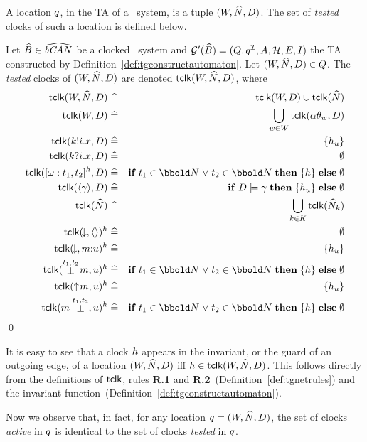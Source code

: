 A location $q$, in the TA of a \bcandle\ system, is a tuple
$(W,{\widehat{N}},{D})$. The set of \emph{tested} clocks of
such a location is defined below.
\begin{definition}\label{def:sgtclk}
Let ${\widehat{{B}}} \in {\widehat{{\text{\it bCAN\/}_{}}}}$ be a clocked \bcandle\ system and $\GrImpl(\csys)
= (\tglocs,\tgiloc,\Actions,\clocks,\tgedges,\tginv)$
the TA constructed by Definition~\ref{def:tgconstructautomaton}. 
Let $(W,{\widehat{N}},{D}) \in Q$. The \emph{tested} clocks of
$(W,{\widehat{N}}, {D})$ are denoted ${\mathop{\mathrm{t}{\sf clk}}}(W,{\widehat{N}},{D})$, where
\begin{eqnarray*}
\tclk(\W,\NN,\D) & \defs & \tclk(\W,\D) \cup \tclk(\NN) \\
\tclk(\W,\D) & \defs & \bigcup_{\ww \in \W} \tclk(\tattrib\tr_\ww, \D) \\
\tclk(\kk!\ii.\xx,\D) & \defs & \{\uclock\} \\
\tclk(\kk?\ii.\xx,\D) & \defs & \emptyset \\
\tclk([\op:\ti_1,\ti_2]^\clock,\D) & \defs & \ite{\ti_1 \in \nat \lor \ti_2 \in \nat}{\{\clock\}}{\emptyset} \\
\tclk(\gu{\g},\D) & \defs & \ite{\D \models \g}{\{\uclock\}}{\emptyset} \\
\tclk(\NN) & \defs & \bigcup_{\kk \in \K} \tclk(\NN_\kk) \\
\tclk(\free,\emq)^\clock & \defs & \emptyset \\
\tclk(\free,\mm\cq\mq)^\clock & \defs & \{\uclock\} \\
\tclk(\preact{\ti_1,\ti_2}{\mm},\mq)^\clock & \defs & \ite{\ti_1 \in \nat \lor \ti_2 \in \nat}{\{\clock\}}{\emptyset} \\
\tclk(\offers{\mm},\mq)^\clock & \defs & \{\uclock\} \\
\tclk(\postact{\ti_1,\ti_2}{\mm},\mq)^\clock & \defs & \ite{\ti_1 \in \nat \lor \ti_2 \in \nat}{\{\clock\}}{\emptyset}
\end{eqnarray*}   
\qed
\end{definition}
It is easy to see that a clock $h$ appears in the invariant, or
the guard of an outgoing edge, of a location $(W,{\widehat{N}},{D})$ iff $h \in
{\mathop{\mathrm{t}{\sf clk}}}(W,{\widehat{N}},{D})$.  This follows directly from the definitions of
${\mathop{\mathrm{t}{\sf clk}}}$, rules \textbf{R.1} and \textbf{R.2}~(Definition~\ref{def:tgnetrules})
and the invariant function~(Definition~\ref{def:tgconstructautomaton}).

Now we observe that, in fact, for any location $q = (W,{\widehat{N}},{D})$,
the set of clocks \emph{active} in $q$ is identical to the set of clocks
\emph{tested} in $q$.
 
